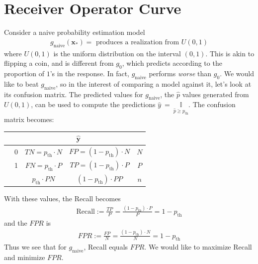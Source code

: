 \documentclass[12pt, a4paper]{article}
\theoremstyle{definition}
\begin{document}
	\section{Receiver Operator Curve}
	Consider a naive probability estimation model
	\begin{align*}
		g_{\text{naive}}(\bm{x}_*) = \text{ produces a realization from } U(0, 1)
	\end{align*}
	where $U(0, 1)$ is the uniform distribution on the interval $(0, 1)$.
	This is akin to flipping a coin, and is different from $g_0$, which predicts
	according to the proportion of $1$'s in the response. In fact, $g_{\text{naive}}$
	performs \textit{worse} than $g_0$. We would like to beat $g_{\text{naive}}$,
	so in the interest of comparing a model against it, let's look at its confusion
	matrix. The predicted values for $g_{\text{naive}}$, the $\hat{p}$ values
	generated from $U(0, 1)$, can be used to compute the predictions
	$\hat{y}~=~\underset{\hat{p} \geq p_{\text{th}}}{\mathbb{I}}$. The
	confusion matrix becomes:
	\begin{center}
		\begin{tabular}{c|c|c|c|c}
			{} & \multicolumn{4}{c}{$\hat{\bm{y}}$}\\
			\hline
			\multirow{3}{*}{\rotatebox[origin=c]{90}{$\bm{y}$}}
			{} & 0  & $TN = p_{\text{th}} \cdot N$ & $FP = (1 - p_{\text{th}})\cdot N$ & $N$\\
			\hline
			{} & 1  & $FN = p_{\text{th}} \cdot P$ & $TP = (1 - p_{\text{th}})\cdot P$ & $P$\\
			\hline
			{} & {} & $p_{\text{th}} \cdot PN$ & $(1 - p_{\text{th}}) \cdot PP$ & $n$
		\end{tabular}
	\end{center}
	With these values, the Recall becomes
	\begin{align*}
		\text{Recall} := \frac{TP}{P} = \frac{(1 - p_{\text{th}})\cdot P}{P} = 1 - p_{\text{th}}
	\end{align*}
	and the $FPR$ is
	\begin{align*}
		FPR := \frac{FP}{N} = \frac{(1 - p_{\text{th}})\cdot N}{N} = 1 - p_{\text{th}}
	\end{align*}
	Thus we see that for $g_{\text{naive}}$, Recall equals $FPR$. We would like
	to maximize Recall and minimize $FPR$.
\end{document}
